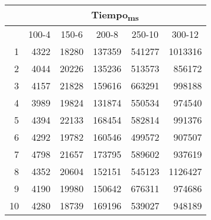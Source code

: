 \documentclass{article}
\begin{document}
  \begin{center}
    \begin{tabular}{ | r | r | r | r | r | r | }
      \hline
      \rowcolor{DarkGrey}
      & \multicolumn{5}{|c|}{Tiempo\textsubscript{ms}} \\ \hline
      \rowcolor{DarkGrey}
      \multicolumn{1}{|c|}{Réplica} & \multicolumn{1}{|c|}{100-4} & \multicolumn{1}{|c|}{150-6} & \multicolumn{1}{|c|}{200-8}
      & \multicolumn{1}{|c|}{250-10} & \multicolumn{1}{|c|}{300-12}\\ \hline \hline
      1 & 4322 & 18280 & 137359 & 541277 & 1013316 \\ \hline
      \rowcolor{LightGrey}
      2 & 4044 & 20226 & 135236 & 513573 & 856172 \\ \hline
      3 & 4157 & 21828 & 159616 & 663291 & 998188 \\ \hline
      \rowcolor{LightGrey}
      4 & 3989 & 19824 & 131874 & 550534 & 974540 \\ \hline
      5 & 4394 & 22133 & 168454 & 582814 & 991376 \\ \hline
      \rowcolor{LightGrey}
      6 & 4292 & 19782 & 160546 & 499572 & 907507 \\ \hline
      7 & 4798 & 21657 & 173795 & 589602 & 937619  \\ \hline
      \rowcolor{LightGrey}
      8 & 4352 & 20604 & 152151 & 545123 & 1126427 \\ \hline
      9 & 4190 & 19980 & 150642 & 676311 & 974686 \\ \hline
      \rowcolor{LightGrey}
      10 & 4280 & 18739 & 169196 & 539027 & 948189\\ \hline
    \end{tabular}
    \label{table:T3}
  \end{center}
\end{document}
